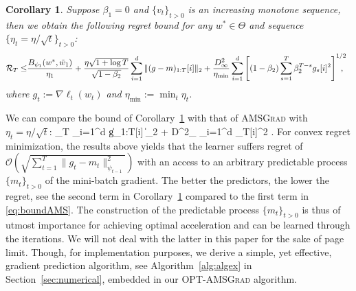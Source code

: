 \documentclass[11pt]{article}
\newtheorem{Corollary}{Corollary}
\theoremstyle{k}
\begin{document}
\begin{Corollary}\label{cor:corollary}
Suppose $\beta_1=0$ and $\{v_t\}_{t>0}$ is an increasing monotone sequence, then we obtain the following regret bound for any $w^{*} \in \Theta$ and sequence $\{ \eta_t = \eta/\sqrt{t}\}_{t>0}$: 
\begin{equation}\notag
\begin{aligned}
\mathcal{R}_T \leq & \frac{ B_{\psi_1}(w^*, \tilde{w}_{1})}{\eta_1}
+ \frac{\eta \sqrt{1 + \log T}}{\sqrt{1 - \beta_2}} \sum_{i=1}^d \| (g-m)_{1:T}[i] \|_2 +\frac{D_{\infty}^2}{\eta_{\min}} \sum_{i=1}^d \left[ (1-\beta_2) \sum_{s=1}^{T} \beta_2^{T-s} g_s[i]^2 \right]^{1/2} \hspace{-0.3cm},
\end{aligned}
\end{equation}
where $g_{t}:= \nabla \ell_{t}(w_t)$ and $\eta_{{\min}} := \min_{{t}} \eta_{t}$.
\end{Corollary}
We can compare the bound of Corollary~\ref{cor:corollary} with that of \textsc{AMSGrad} \citep{RKK18} with $\eta_t = \eta/\sqrt{t}$:
\beq\label{eq:boundAMS}
_T \leq {} \sum_{i=1}^d \| g_{1:T}[i]  \|_2 + D^2_{\infty} \sum_{i=1}^d _T[i]^2 \eqsp.
\eeq
For convex regret minimization, the results above yields that the learner suffers regret of $\mathcal{O}(\sqrt{\sum_{t=1}^T \| g_t - m_t  \|^2_{\psi_{t-1}}})$ with an access to an arbitrary predictable process $\{m_t\}_{t>0}$ of the mini-batch gradient. The better the predictors, the lower the regret, see the second term in Corollary~\ref{cor:corollary} compared to the first term in \eqref{eq:boundAMS}.
The construction of the predictable process $\{m_t\}_{t>0}$ is thus of utmost importance for achieving optimal acceleration and can be learned through the iterations.
We will not deal with the latter in this paper for the sake of page limit.
Though, for implementation purposes, we derive a simple, yet effective, gradient prediction algorithm, see Algorithm~\ref{alg:algex} in Section~\ref{sec:numerical}, embedded in our \textsc{OPT-AMSGrad} algorithm.
\end{document}
